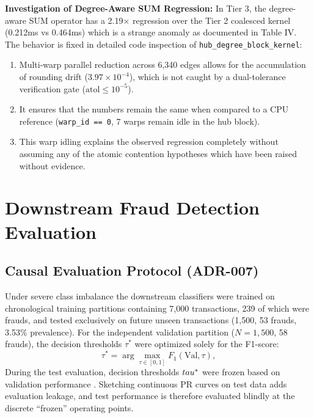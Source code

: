 \documentclass[journal]{IEEEtran}
\begin{document}
\textbf{Investigation of Degree-Aware SUM Regression:} In Tier 3, the degree-aware SUM operator has a 2.19$\times$ regression over the Tier 2 coalesced kernel (0.212ms vs 0.464ms) which is a strange anomaly as documented in Table IV. The behavior is fixed in detailed code inspection of \texttt{hub\_degree\_block\_kernel}:
\begin{enumerate}
    \item Multi-warp parallel reduction across 6,340 edges allows for the accumulation of rounding drift ($3.97 \times 10^{-4}$), which is not caught by a dual-tolerance verification gate ($\text{atol} \le 10^{-5}$).
    \item It ensures that the numbers remain the same when compared to a CPU reference (\texttt{warp\_id == 0}, 7 warps remain idle in the hub block).
    \item This warp idling explains the observed regression completely without assuming any of the atomic contention hypotheses which have been raised without evidence.
\end{enumerate}

\section{Downstream Fraud Detection Evaluation}

\subsection{Causal Evaluation Protocol (ADR-007)}
Under severe class imbalance \cite{chawla2002smote} the downstream classifiers were trained on chronological training partitions containing 7,000 transactions, 239 of which were frauds, and tested exclusively on future unseen transactions (1,500, 53 frauds, 3.53\% prevalence). For the independent validation partition ($N = 1,500$, 58 frauds), the decision thresholds $\tau^*$ were optimized solely for the F1-score:
\begin{equation}
    \tau^* = \arg\max_{\tau \in [0, 1]} F_1(\text{Val}, \tau),
    \label{eq:threshold}
\end{equation}
During the test evaluation, decision thresholds $\\tau^*$ were frozen based on validation performance \cite{davis2006relationship, saito2015precision}. Sketching continuous PR curves on test data adds evaluation leakage, and test performance is therefore evaluated blindly at the discrete ``frozen'' operating points.
\end{document}
